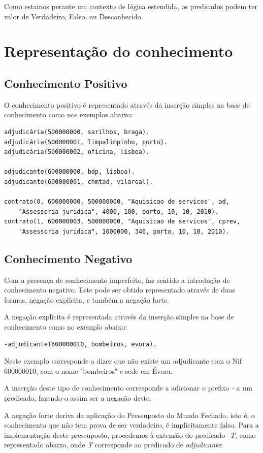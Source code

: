 \documentclass[a4paper]{report}
\begin{document}
Como estamos perante um contexto de lógica estendida, os predicados podem ter
valor de Verdadeiro, Falso, ou Desconhecido.

\section{Representação do conhecimento}

\subsection{Conhecimento Positivo}
O conhecimento positivo é representado através da inserção simples na base de
conhecimento como nos exemplos abaixo:

\begin{verbatim}
adjudicária(500000000, sarilhos, braga).
adjudicária(500000001, limpalimpinho, porto).
adjudicária(500000002, oficina, lisboa).

adjudicante(600000000, bdp, lisboa).
adjudicante(600000001, chmtad, vilareal).

contrato(0, 600000000, 500000000, "Aquisicao de servicos", ad, 
    "Assessoria juridica", 4000, 100, porto, 10, 10, 2010).
contrato(1, 600000003, 500000000, "Aquisicao de servicos", cprev, 
    "Assessoria juridica", 1000000, 346, porto, 10, 10, 2010).
\end{verbatim}

\subsection{Conhecimento Negativo}
Com a presença de conhecimento imperfeito, faz sentido a introdução de
conhecimento negativo. Este pode ser obtido representado através de duas formas,
negação explícita, e também a negação forte.

A negação explícita é representada através da inserção simples na base de
conhecimento como no exemplo abaixo:

\begin{verbatim}
-adjudicante(600000010, bombeiros, evora).
\end{verbatim}

Neste exemplo corresponde a dizer que não existe um adjudicante com o Nif
600000010, com o nome "bombeiros" e sede em Évora.

A inserção deste tipo de conhecimento corresponde a adicionar o prefixo
\textit{-} a um predicado, fazendo-o assim ser a negação deste.

A negação forte deriva da aplicação do Pressuposto do Mundo Fechado, isto é, o
conhecimento que não tem prova de ser verdadeiro, é implicitamente falso. 
Para a implementação deste pressuposto, procedemos à extensão do predicado
\textit{-T}, como representado abaixo, onde \textit{T} corresponde ao predicado
de \textit{adjudicante}:
\end{document}
